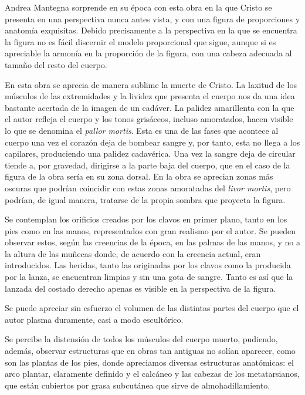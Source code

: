 Andrea Mantegna sorprende en su época con esta obra en la que Cristo se presenta en una perspectiva nunca antes vista, y con una figura de proporciones y anatomía exquisitas. Debido precisamente a la perspectiva en la que se encuentra la figura no es fácil discernir el modelo proporcional que sigue, aunque si es apreciable la armonía en la proporción de la figura, con una cabeza adecuada al tamaño del resto del cuerpo.

En esta obra se aprecia de manera sublime la muerte de Cristo. La laxitud de los músculos de las extremidades y la lividez que presenta el cuerpo nos da una idea bastante acertada de la imagen de un cadáver. La palidez amarillenta con la que el autor refleja el cuerpo y los tonos grisáceos, incluso amoratados, hacen visible lo que se denomina el \textit{pallor mortis}. Esta es una de las fases que acontece al cuerpo una vez el corazón deja de bombear sangre y, por tanto, esta no llega a los capilares, produciendo una palidez cadavérica. Una vez la sangre deja de circular tiende a, por gravedad, dirigirse a la parte baja del cuerpo, que en el caso de la figura de la obra sería en su zona dorsal. En la obra se aprecian zonas más oscuras que podrían coincidir con estas zonas amoratadas del \textit{livor mortis}, pero podrían, de igual manera, tratarse de la propia sombra que proyecta la figura.

Se contemplan los orificios creados por los clavos en primer plano, tanto en los pies como en las manos, representados con gran realismo por el autor. Se pueden observar estos, según las creencias de la época, en las palmas de las manos, y no a la altura de las muñecas donde, de acuerdo con la creencia actual, eran introducidos.
Las heridas, tanto las originadas por los clavos como la producida por la lanza, se encuentran limpias y sin una gota de sangre. Tanto es así que la lanzada del costado derecho apenas es visible en la perspectiva de la figura.

Se puede apreciar sin esfuerzo el volumen de las distintas partes del cuerpo que el autor plasma duramente, casi a modo escultórico. 

Se percibe la distensión de todos los músculos del cuerpo muerto, pudiendo, además, observar estructuras que en obras tan antiguas no solían aparecer, como son las plantas de los pies, donde apreciamos diversas estructuras anatómicas: el arco plantar, claramente definido y el calcáneo y las cabezas de los metatarsianos, que están cubiertos por grasa subcutánea que sirve de almohadillamiento.

